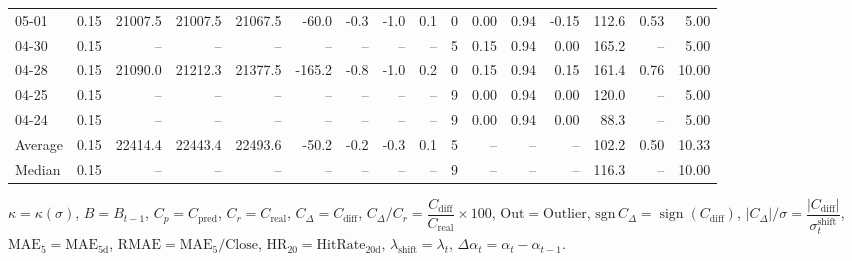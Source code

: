 \begin{threeparttable}
{\begin{tabular}{lrrrrrrrrrrrrrrr}
  05-01 &     0.15 & 21007.5 & 21007.5 & 21067.5 &      -60.0 &           -0.3 &                     -1.0 &                 0.1 &              0 &       0.00 &      0.94 &          -0.15 &            112.6 &            0.53 &                   5.00 \\
  04-30 &     0.15 &      -- &      -- &      -- &         -- &             -- &                       -- &                  -- &              5 &       0.15 &      0.94 &           0.00 &            165.2 &              -- &                   5.00 \\
  04-28 &     0.15 & 21090.0 & 21212.3 & 21377.5 &     -165.2 &           -0.8 &                     -1.0 &                 0.2 &              0 &       0.15 &      0.94 &           0.15 &            161.4 &            0.76 &                  10.00 \\
  04-25 &     0.15 &      -- &      -- &      -- &         -- &             -- &                       -- &                  -- &              9 &       0.00 &      0.94 &           0.00 &            120.0 &              -- &                   5.00 \\
  04-24 &     0.15 &      -- &      -- &      -- &         -- &             -- &                       -- &                  -- &              9 &       0.00 &      0.94 &           0.00 &             88.3 &              -- &                   5.00 \\
Average &     0.15 & 22414.4 & 22443.4 & 22493.6 &      -50.2 &           -0.2 &                     -0.3 &                 0.1 &              5 &         -- &        -- &             -- &            102.2 &            0.50 &                  10.33 \\
 Median &     0.15 &      -- &      -- &      -- &         -- &             -- &                       -- &                  -- &              9 &         -- &        -- &             -- &            116.3 &              -- &                  10.00 \\
\bottomrule
\end{tabular}
}
\begin{tablenotes}\footnotesize
\item $\kappa=\kappa(\sigma)$, $B=B_{t-1}$, $C_p=C_{\text{pred}}$, $C_r=C_{\text{real}}$, $C_\Delta=C_{\text{diff}}$, $C_\Delta/C_r=\dfrac{C_{\text{diff}}}{C_{\text{real}}}\times100$, $\mathrm{Out}=\text{Outlier}$, $\mathrm{sgn}\,C_\Delta=\operatorname{sign}(C_{\text{diff}})$, $|C_\Delta|/\sigma=\dfrac{|C_{\text{diff}}|}{\sigma_t^{\text{shift}}}$, $\mathrm{MAE}_5=\mathrm{MAE}_{5\text{d}}$, $\mathrm{RMAE}= \mathrm{MAE}_5 / \text{Close}$, $\mathrm{HR}_{20}=\mathrm{HitRate}_{20\text{d}}$, 
$\lambda_{\text{shift}}=\lambda_t$, 
$\Delta\alpha_t=\alpha_t-\alpha_{t-1}$.
\end{tablenotes}
\end{threeparttable}
\endgroup

